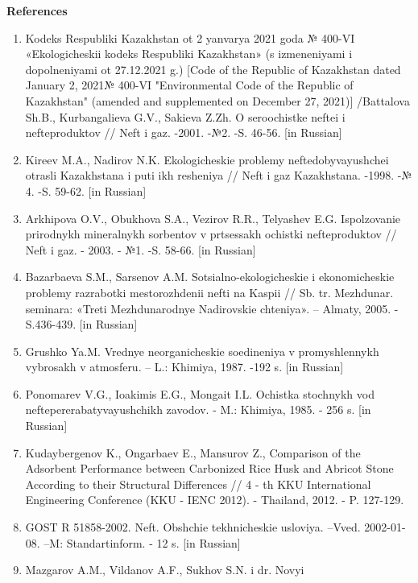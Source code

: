 {\bfseries References}

\begin{enumerate}
\def\labelenumi{\arabic{enumi}.}
\item
  Kodeks Respubliki Kazakhstan ot 2 yanvarya 2021 goda № 400-VI
  «Ekologicheskii kodeks Respubliki Kazakhstan» (s izmeneniyami i
  dopolneniyami ot 27.12.2021 g.) {[}Code of the Republic of Kazakhstan
  dated January 2, 2021№ 400-VI "Environmental Code of the Republic of
  Kazakhstan" (amended and supplemented on December 27, 2021){]}
  /Battalova Sh.B., Kurbangalieva G.V., Sakieva Z.Zh. O seroochistke
  neftei i nefteproduktov // Neft\textquotesingle{} i gaz. -2001. -№2.
  -S. 46-56. {[}in Russian{]}
\item
  Kireev M.A., Nadirov N.K. Ekologicheskie problemy neftedobyvayushchei
  otrasli Kazakhstana i puti ikh resheniya // Neft\textquotesingle{} i
  gaz Kazakhstana. -1998. -№ 4. -S. 59-62. {[}in Russian{]}
\item
  Arkhipova O.V., Obukhova S.A., Vezirov R.R., Telyashev E.G.
  Ispol\textquotesingle zovanie prirodnykh mineral\textquotesingle nykh
  sorbentov v prtsessakh ochistki nefteproduktov //
  Neft\textquotesingle{} i gaz. - 2003. - №1. -S. 58-66. {[}in
  Russian{]}
\item
  Bazarbaeva S.M., Sarsenov A.M.
  Sotsial\textquotesingle no-ekologicheskie i ekonomicheskie problemy
  razrabotki mestorozhdenii nefti na Kaspii // Sb. tr. Mezhdunar.
  seminara: «Tret\textquotesingle i Mezhdunarodnye Nadirovskie
  chteniya». -- Almaty, 2005. - S.436-439. {[}in Russian{]}
\item
  Grushko Ya.M. Vrednye neorganicheskie soedineniya v promyshlennykh
  vybrosakh v atmosferu. -- L.: Khimiya, 1987. -192 s. {[}in Russian{]}
\item
  Ponomarev V.G., Ioakimis E.G., Mongait I.L. Ochistka stochnykh vod
  neftepererabatyvayushchikh zavodov. - M.: Khimiya, 1985. - 256 s.
  {[}in Russian{]}
\item
  Kudaybergenov K., Ongarbaev E., Mansurov Z., Comparison of the
  Adsorbent Performance between Carbonized Rice Husk and Abricot Stone
  According to their Structural Differences // 4 - th KKU International
  Engineering Conference (KKU - IENC 2012). - Thailand, 2012. - P.
  127-129.
\item
  GOST R 51858-2002. Neft\textquotesingle. Obshchie tekhnicheskie
  usloviya. --Vved. 2002-01-08. --M: Standartinform. - 12 s. {[}in
  Russian{]}
\item
  Mazgarov A.M., Vil\textquotesingle danov A.F., Sukhov S.N. i dr. Novyi

\end{enumerate}

